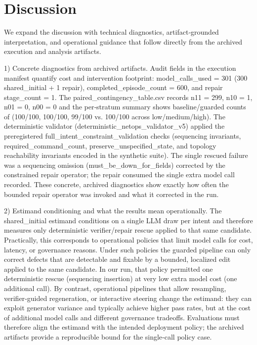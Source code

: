 \documentclass[conference]{IEEEtran}
\begin{document}
\section{Discussion}
We expand the discussion with technical diagnostics, artifact‑grounded interpretation, and operational guidance that follow directly from the archived execution and analysis artifacts.

1) Concrete diagnostics from archived artifacts. Audit fields in the execution manifest quantify cost and intervention footprint: model\_calls\_used = 301 (300 shared\_initial + 1 repair), completed\_episode\_count = 600, and repair stage\_count = 1. The paired\_contingency\_table.csv records n11 = 299, n10 = 1, n01 = 0, n00 = 0 and the per‑stratum summary shows baseline/guarded counts of (100/100, 100/100, 99/100 vs. 100/100 across low/medium/high). The deterministic validator (deterministic\_netops\_validator\_v5) applied the preregistered full\_intent\_constraint\_validation checks (sequencing invariants, required\_command\_count, preserve\_unspecified\_state, and topology reachability invariants encoded in the synthetic suite). The single rescued failure was a sequencing omission (must\_be\_down\_for\_fields) corrected by the constrained repair operator; the repair consumed the single extra model call recorded. These concrete, archived diagnostics show exactly how often the bounded repair operator was invoked and what it corrected in the run.

2) Estimand conditioning and what the results mean operationally. The shared\_initial estimand conditions on a single LLM draw per intent and therefore measures only deterministic verifier/repair rescue applied to that same candidate. Practically, this corresponds to operational policies that limit model calls for cost, latency, or governance reasons. Under such policies the guarded pipeline can only correct defects that are detectable and fixable by a bounded, localized edit applied to the same candidate. In our run, that policy permitted one deterministic rescue (sequencing insertion) at very low extra model cost (one additional call). By contrast, operational pipelines that allow resampling, verifier‑guided regeneration, or interactive steering change the estimand: they can exploit generator variance and typically achieve higher pass rates, but at the cost of additional model calls and different governance tradeoffs. Evaluations must therefore align the estimand with the intended deployment policy; the archived artifacts provide a reproducible bound for the single‑call policy case.
\end{document}

